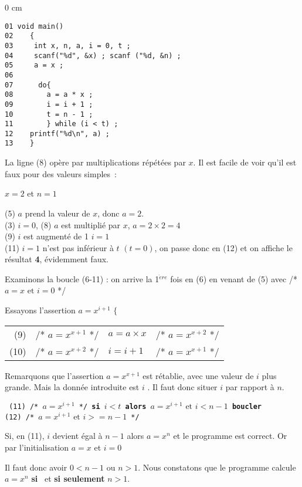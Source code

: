 {\setlength {\parindent} {0 cm}
\begin{multicols}{2}%

{\small%
\begin{verbatim}01 void main()
02    {
03     int x, n, a, i = 0, t ;
04     scanf("%d", &x) ; scanf ("%d, &n) ;
05     a = x ;
06     
07      do{
08        a = a * x ;
09        i = i + 1 ;
10        t = n - 1 ;
11        } while (i < t) ;
12    printf("%d\n", a) ;
13    }
\end{verbatim} }
La ligne (8) op\`ere par
multiplications r\'ep\'et\'ees par $x$. Il est facile de voir
qu'il est faux pour des valeurs simples~:

$ x = 2 $   et  $ n = 1 $

(5) $a$ prend la valeur de $x$, donc $ a = 2$. \\
(3)  $ i = 0$, 
(8)  $a$ est multipli\'e par $x$, $ a = 2 \times 2 = 4 $\\
(9)  $ i$ est augment\'e de 1  $ i = 1 $ \\
(11)  $ i = 1 $ n'est pas inf\'erieur \`a $t$ $(t = 0) $, on
passe donc en (12) et on affiche le r\'esultat {\bf 4},
\'evidemment faux.
\end{multicols}


Examinons la boucle (6-11) :  on arrive la 1$^{\grave ere}$ fois en (6)
en venant de  (5) avec
/* $a = x   \mbox { et } i = 0$ */

Essayons l'assertion $a = x^{i+1}$ 
$\Biggl\{$\begin{tabular}{rrlr}
(9)  &/* $a=x^{x+1}$ */& $a=a\times x$&/* $a=x^{x+2}$ */\\
(10) &/* $a=x^{x+2}$ */& $i=i+1$      &/* $a=x^{x+1}$ */\\
\end{tabular}  

Remarquons que l'assertion $ a = x^{x+1} $ est r\'etablie, avec une
valeur de $i$ plus grande.
Mais la donn\'ee introduite est $i$ .  Il faut donc situer $i$ par
rapport \`a $ n$. 

{\tt
(11) /* $a = x^{i+1}$ */ {\bf si} $i < t$ {\bf alors} $a = x^{i+1}
\mbox { et } i < n - 1$ {\bf boucler} \\
(12) /* $a = x^{i+1} \mbox { et } i>=n - 1 $ */ 
}

Si, en (11), $ i$ devient \'egal \`a $ n - 1 $ alors $ a = x^{n} $
et le programme est correct.
Or par l'initialisation $ a = x  $ et $ i = 0 $ 

Il faut donc avoir $ 0 < n - 1 $  ou $ n > 1 $. Nous constatons que le programme
calcule $ a = x^{n} $ {\bf si}  \mbox { et} {\bf si seulement} $ n > 1 $.

}

